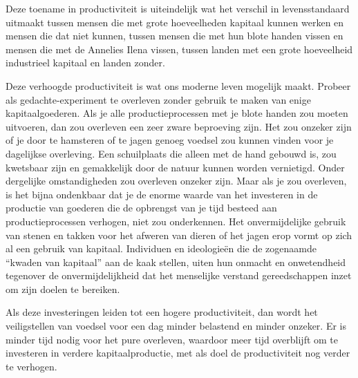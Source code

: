 Deze toename in productiviteit is uiteindelijk wat het verschil in levensstandaard uitmaakt tussen mensen die met grote hoeveelheden kapitaal kunnen werken en mensen die dat niet kunnen, tussen mensen die met hun blote handen vissen en mensen die met de Annelies Ilena vissen, tussen landen met een grote hoeveelheid industrieel kapitaal en landen zonder.

Deze verhoogde productiviteit is wat ons moderne leven mogelijk maakt. Probeer als gedachte-experiment te overleven zonder gebruik te maken van enige kapitaalgoederen. Als je alle productieprocessen met je blote handen zou moeten uitvoeren, dan zou overleven een zeer zware beproeving zijn. Het zou onzeker zijn of je door te hamsteren of te jagen genoeg voedsel zou kunnen vinden voor je dagelijkse overleving. Een schuilplaats die alleen met de hand gebouwd is, zou kwetsbaar zijn en gemakkelijk door de natuur kunnen worden vernietigd. Onder dergelijke omstandigheden zou overleven onzeker zijn. Maar als je zou overleven, is het bijna ondenkbaar dat je de enorme waarde van het investeren in de productie van goederen die de opbrengst van je tijd besteed aan productieprocessen verhogen, niet zou onderkennen. Het onvermijdelijke gebruik van stenen en takken voor het afweren van dieren of het jagen erop vormt op zich al een gebruik van kapitaal. Individuen en ideologieën die de zogenaamde ``kwaden van kapitaal'' aan de kaak stellen, uiten hun onmacht en onwetendheid tegenover de onvermijdelijkheid dat het menselijke verstand gereedschappen inzet om zijn doelen te bereiken.

Als deze investeringen leiden tot een hogere productiviteit, dan wordt het veiligstellen van voedsel voor een dag minder belastend en minder onzeker. Er is minder tijd nodig voor het pure overleven, waardoor meer tijd overblijft om te investeren in verdere kapitaalproductie, met als doel de productiviteit nog verder te verhogen.

